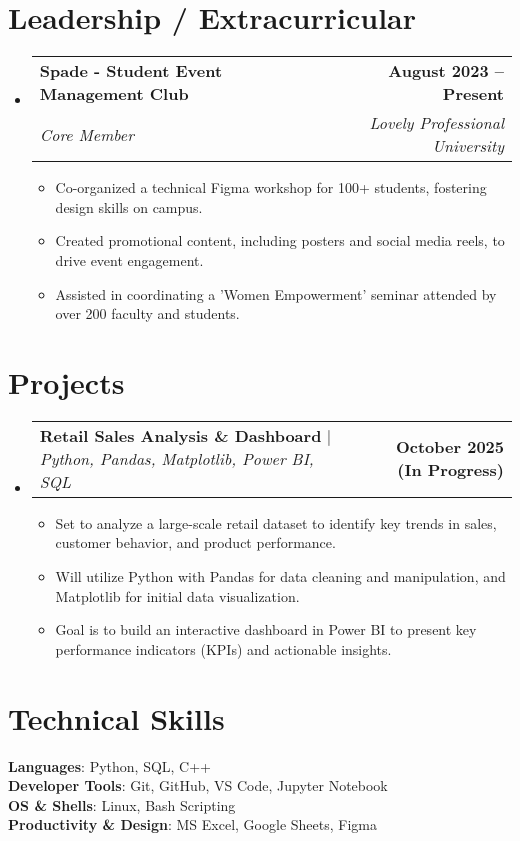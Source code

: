 \documentclass[letterpaper,11pt]{article}
\makeatletter
\newcommand{\resumeItem}[1]{
  \item\small{
    {#1 \vspace{-2pt}}
  }
}
\newcommand{\resumeSubheading}[4]{
  \vspace{-2pt}\item
    \begin{tabular*}{1.0\textwidth}[t]{l@{\extracolsep{\fill}}r}
      \textbf{#1} & \textbf{\small #2} \\
      \textit{\small#3} & \textit{\small #4} \\
    \end{tabular*}\vspace{-7pt}
}
\newcommand{\resumeProjectHeading}[2]{
    \item
    \begin{tabular*}{1.001\textwidth}{l@{\extracolsep{\fill}}r}
      \small#1 & \textbf{\small #2}\\
    \end{tabular*}\vspace{-7pt}
}
\newcommand{\resumeSubHeadingListStart}{\begin{itemize}[leftmargin=0.0in, label={}]}
\newcommand{\resumeSubHeadingListEnd}{\end{itemize}}
\newcommand{\resumeItemListStart}{\begin{itemize}}
\newcommand{\resumeItemListEnd}{\end{itemize}\vspace{-5pt}}
\makeatother
\begin{document}
\section{Leadership / Extracurricular}
    \resumeSubHeadingListStart
        \resumeSubheading{Spade - Student Event Management Club}{August 2023 -- Present}
        {Core Member}{Lovely Professional University}
            \resumeItemListStart
                \resumeItem{Co-organized a technical Figma workshop for 100+ students, fostering design skills on campus.}
                \resumeItem{Created promotional content, including posters and social media reels, to drive event engagement.}
                \resumeItem{Assisted in coordinating a 'Women Empowerment' seminar attended by over 200 faculty and students.}
            \resumeItemListEnd
    \resumeSubHeadingListEnd


\section{Projects}
    \vspace{-5pt}
    \resumeSubHeadingListStart
      \resumeProjectHeading
          {\textbf{Retail Sales Analysis \& Dashboard} $|$ \emph{Python, Pandas, Matplotlib, Power BI, SQL}}{October 2025 (In Progress)}
          \resumeItemListStart
            \resumeItem{Set to analyze a large-scale retail dataset to identify key trends in sales, customer behavior, and product performance.}
            \resumeItem{Will utilize Python with Pandas for data cleaning and manipulation, and Matplotlib for initial data visualization.}
            \resumeItem{Goal is to build an interactive dashboard in Power BI to present key performance indicators (KPIs) and actionable insights.}
          \resumeItemListEnd
    \resumeSubHeadingListEnd
\vspace{-15pt}
%
\section{Technical Skills}
 \begin{itemize}[leftmargin=0.15in, label={}]
    \small{\item{
     \textbf{Languages}{: Python, SQL, C++} \\
     \textbf{Developer Tools}{: Git, GitHub, VS Code, Jupyter Notebook} \\
     \textbf{OS \& Shells}{: Linux, Bash Scripting} \\
     \textbf{Productivity \& Design}{: MS Excel, Google Sheets, Figma} \\
    }}
 \end{itemize}
 \vspace{-16pt}
\end{document}
